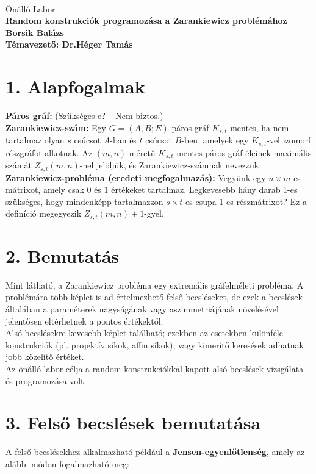 \documentclass[12pt,a4paper]{article}
\begin{document}
 \ \
\vspace{2mm}
\begin{center}
{\Large\sc
Önálló Labor\\[5mm]
\bf 
Random konstrukciók programozása a Zarankiewicz problémához
\\[10mm]
{\Large
Borsik Balázs
}\\[10mm]
Témavezető: Dr.Héger Tamás
}
\end{center}
\vspace{1cm}

\section*{1. Alapfogalmak}
\textbf{Páros gráf:} (Szükséges-e? – Nem biztos.)\\[2mm]
\textbf{Zarankiewicz-szám:} Egy $G = (A,B;E)$ páros gráf $K_{s,t}$-mentes, ha nem tartalmaz olyan $s$ csúcsot $A$-ban és $t$ csúcsot $B$-ben, amelyek egy $K_{s,t}$-vel izomorf részgráfot alkotnak. Az $(m,n)$ méretű $K_{s,t}$-mentes páros gráf éleinek maximális számát $Z_{s,t}(m,n)$-nel jelöljük, és Zarankiewicz-számnak nevezzük.\\[2mm]
\textbf{Zarankiewicz-probléma (eredeti megfogalmazás):} Vegyünk egy $n \times m$-es mátrixot, amely csak 0 és 1 értékeket tartalmaz. Legkevesebb hány darab 1-es szükséges, hogy mindenképp tartalmazzon $s \times t$-es csupa 1-es részmátrixot? Ez a definíció megegyezik $Z_{s,t}(m,n) + 1$-gyel.
\section*{2. Bemutatás}
Mint látható, a Zarankiewicz probléma egy extremális gráfelméleti probléma. A problémára több képlet is ad értelmezhető felső becsléseket, de ezek a becslések általában a paraméterek nagyságának vagy aszimmetriájának növelésével jelentősen eltérhetnek a pontos értékektől.\\

Alsó becslésekre kevesebb képlet található; ezekben az esetekben különféle konstrukciók (pl. projektív síkok, affin síkok), vagy kimerítő keresések adhatnak jobb közelítő értéket.\\

Az önálló labor célja a random konstrukciókkal kapott alsó becslések vizsgálata és programozása volt.

\section*{3. Felső becslések bemutatása}
A felső becslésekhez alkalmazható például a \textbf{Jensen-egyenlőtlenség}, amely az alábbi módon fogalmazható meg:
\end{document}
